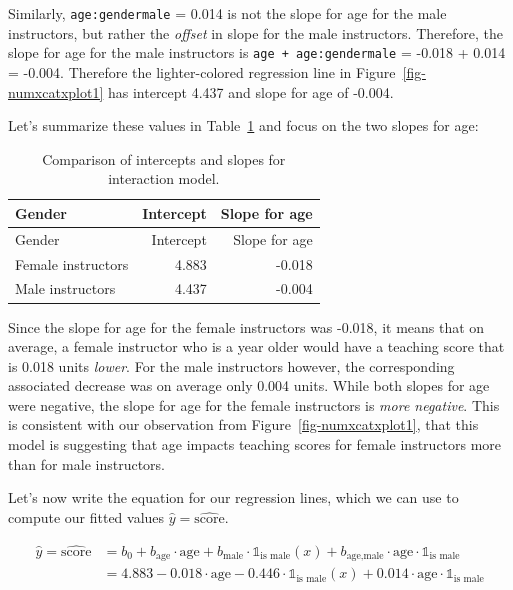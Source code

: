 \documentclass[
  letterpaper,
  DIV=11,
  numbers=noendperiod]{scrreprt}
\theoremstyle{definition}
\theoremstyle{remark}
\begin{document}
Similarly, \texttt{age:gendermale} = 0.014 is not the slope for age for
the male instructors, but rather the \emph{offset} in slope for the male
instructors. Therefore, the slope for age for the male instructors is
\texttt{age\ +\ age:gendermale} = -0.018 + 0.014 = -0.004. Therefore the
lighter-colored regression line in Figure~\ref{fig-numxcatxplot1} has
intercept 4.437 and slope for age of -0.004.

Let's summarize these values in Table~\ref{tbl-interaction-summary} and
focus on the two slopes for age:

\hypertarget{tbl-interaction-summary}{}
\begin{longtable}[]{@{}lrr@{}}
\caption{\label{tbl-interaction-summary}Comparison of intercepts and
slopes for interaction model.}\tabularnewline
\toprule\noalign{}
Gender & Intercept & Slope for age \\
\midrule\noalign{}
\endfirsthead
\toprule\noalign{}
Gender & Intercept & Slope for age \\
\midrule\noalign{}
\endhead
\bottomrule\noalign{}
\endlastfoot
Female instructors & 4.883 & -0.018 \\
Male instructors & 4.437 & -0.004 \\
\end{longtable}

Since the slope for age for the female instructors was -0.018, it means
that on average, a female instructor who is a year older would have a
teaching score that is 0.018 units \emph{lower}. For the male
instructors however, the corresponding associated decrease was on
average only 0.004 units. While both slopes for age were negative, the
slope for age for the female instructors is \emph{more negative}. This
is consistent with our observation from Figure~\ref{fig-numxcatxplot1},
that this model is suggesting that age impacts teaching scores for
female instructors more than for male instructors.

Let's now write the equation for our regression lines, which we can use
to compute our fitted values \(\widehat{y} = \widehat{\text{score}}\).

\[
\begin{aligned}
\widehat{y} = \widehat{\text{score}} &= b_0 + b_{\mbox{age}} \cdot \mbox{age} + b_{\mbox{male}} \cdot \mathbb{1}_{\mbox{is male}}(x) + b_{\mbox{age,male}} \cdot \mbox{age} \cdot \mathbb{1}_{\mbox{is male}}\\
&= 4.883 -0.018 \cdot \mbox{age} - 0.446 \cdot \mathbb{1}_{\mbox{is male}}(x) + 0.014 \cdot \mbox{age} \cdot \mathbb{1}_{\mbox{is male}}
\end{aligned}
\]
\end{document}
